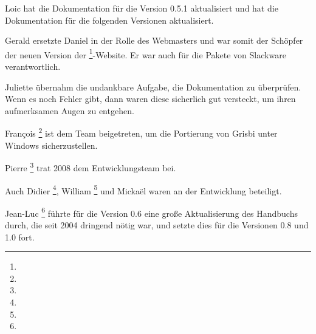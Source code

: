 {%
Loic  hat die Dokumentation für die Version 0.5.1 aktualisiert und hat die Dokumentation für die folgenden Versionen aktualisiert.

Gerald  ersetzte Daniel  in der Rolle des Webmasters und war somit der Schöpfer der neuen Version der \footnote{\urlGrisbi{}}-Website. Er war auch für die Pakete von \gls{Slackware} verantwortlich.

Juliette  übernahm die undankbare Aufgabe, die Dokumentation zu überprüfen. Wenn es noch Fehler gibt, dann waren diese sicherlich gut versteckt, um ihren aufmerksamen Augen zu entgehen.

François \footnote{\urlFrancoisTerrotEmail{}} ist dem Team beigetreten, um die \gls{Portierung} von Grisbi unter \gls{Windows} sicherzustellen.

Pierre \footnote{\urlPierreBiavaEmail{}} trat 2008 dem Entwicklungsteam bei.

Auch Didier \footnote{\urlDidierChevalierEmail{}}, William \footnote{\urlWilliamOllivierEmail{}} und Mickaël  waren an der Entwicklung beteiligt.

Jean-Luc \footnote{\urlJeanLucDuflotEmail{}} führte für die Version 0.6 eine große Aktualisierung des Handbuchs durch, die seit 2004 dringend nötig war, und setzte dies für die Versionen 0.8 und 1.0 fort.

}
